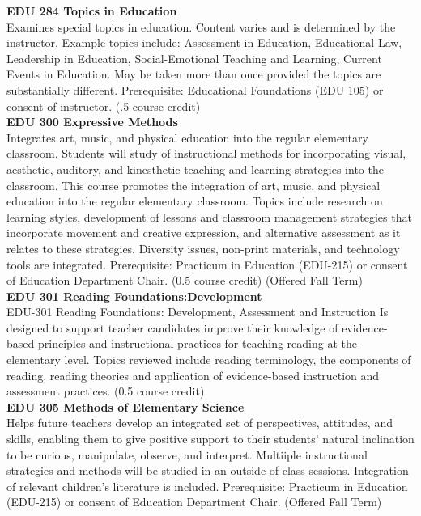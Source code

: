 \documentclass[
  letterpaper,
]{scrbook}
\begin{document}
\textbf{EDU 284 Topics in Education}\\
Examines special topics in education. Content varies and is determined
by the instructor. Example topics include: Assessment in Education,
Educational Law, Leadership in Education, Social-Emotional Teaching and
Learning, Current Events in Education. May be taken more than once
provided the topics are substantially different. Prerequisite:
Educational Foundations (EDU 105) or consent of instructor. (.5 course
credit)\\
\textbf{EDU 300 Expressive Methods}\\
Integrates art, music, and physical education into the regular
elementary classroom. Students will study of instructional methods for
incorporating visual, aesthetic, auditory, and kinesthetic teaching and
learning strategies into the classroom. This course promotes the
integration of art, music, and physical education into the regular
elementary classroom. Topics include research on learning styles,
development of lessons and classroom management strategies that
incorporate movement and creative expression, and alternative assessment
as it relates to these strategies. Diversity issues, non-print
materials, and technology tools are integrated. Prerequisite: Practicum
in Education (EDU-215) or consent of Education Department Chair. (0.5
course credit) (Offered Fall Term)\\
\textbf{EDU 301 Reading Foundations:Development}\\
EDU-301 Reading Foundations: Development, Assessment and Instruction Is
designed to support teacher candidates improve their knowledge of
evidence-based principles and instructional practices for teaching
reading at the elementary level. Topics reviewed include reading
terminology, the components of reading, reading theories and application
of evidence-based instruction and assessment practices. (0.5 course
credit)\\
\textbf{EDU 305 Methods of Elementary Science}\\
Helps future teachers develop an integrated set of perspectives,
attitudes, and skills, enabling them to give positive support to their
students' natural inclination to be curious, manipulate, observe, and
interpret. Multiiple instructional strategies and methods will be
studied in an outside of class sessions. Integration of relevant
children's literature is included. Prerequisite: Practicum in Education
(EDU-215) or consent of Education Department Chair. (Offered Fall
Term)\\
\end{document}
